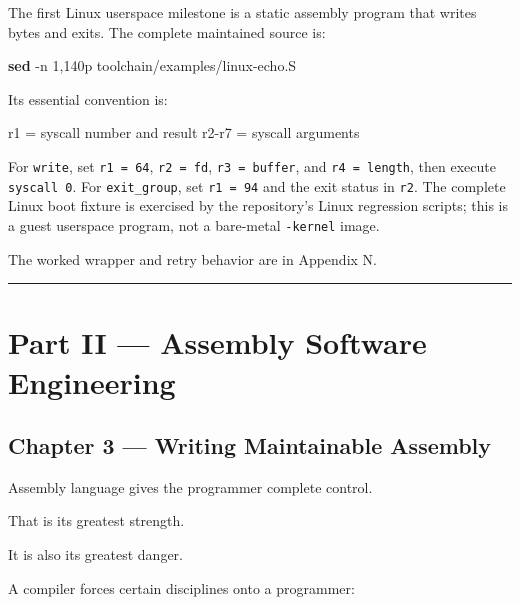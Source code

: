 \documentclass[
  oneside,
  openany]{book}
\newenvironment{Shaded}{\begin{snugshade}}{\end{snugshade}}
\newcommand{\AttributeTok}[1]{\textcolor[rgb]{0.13,0.29,0.53}{#1}}
\newcommand{\FunctionTok}[1]{\textcolor[rgb]{0.13,0.29,0.53}{\textbf{#1}}}
\newcommand{\NormalTok}[1]{#1}
\newcommand{\StringTok}[1]{\textcolor[rgb]{0.31,0.60,0.02}{#1}}
\begin{document}
The first Linux userspace milestone is a static assembly program that
writes bytes and exits. The complete maintained source is:

\begin{Shaded}
\begin{Highlighting}[]
\FunctionTok{sed} \AttributeTok{{-}n} \StringTok{\textquotesingle{}1,140p\textquotesingle{}}\NormalTok{ toolchain/examples/linux{-}echo.S}
\end{Highlighting}
\end{Shaded}

Its essential convention is:

\begin{Shaded}
\begin{Highlighting}[]
\NormalTok{r1 = syscall number and result}
\NormalTok{r2{-}r7 = syscall arguments}
\end{Highlighting}
\end{Shaded}

For \texttt{write}, set \texttt{r1\ =\ 64}, \texttt{r2\ =\ fd},
\texttt{r3\ =\ buffer}, and \texttt{r4\ =\ length}, then execute
\texttt{syscall\ 0}. For \texttt{exit\_group}, set \texttt{r1\ =\ 94}
and the exit status in \texttt{r2}. The complete Linux boot fixture is
exercised by the repository's Linux regression scripts; this is a guest
userspace program, not a bare-metal \texttt{-kernel} image.

The worked wrapper and retry behavior are in Appendix N.

\begin{center}\rule{0.5\linewidth}{0.5pt}\end{center}

\part{Part II — Assembly Software Engineering}

\hypertarget{chapter-3-writing-maintainable-assembly}{%
\chapter{Chapter 3 --- Writing Maintainable
Assembly}\label{chapter-3-writing-maintainable-assembly}}

Assembly language gives the programmer complete control.

That is its greatest strength.

It is also its greatest danger.

A compiler forces certain disciplines onto a programmer:
\end{document}
